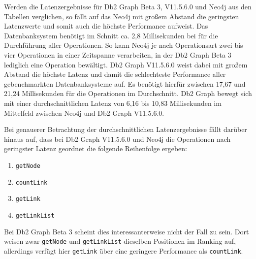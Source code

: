 \begin{table}[!h]
\centering
{}
\caption{Latenz Linkbench-10M-Const Neo4j}
\label{tab:latenz_10m_const:neo4j}
\end{table}

Werden die Latenzergebnisse für Db2 Graph Beta 3, V11.5.6.0 und Neo4j aus den Tabellen verglichen, so fällt auf das Neo4j mit großem Abstand die geringsten Latenzwerte und somit auch die höchste Performance aufweist. Das Datenbanksystem benötigt im Schnitt ca. 2,8 Millisekunden bei für die Durchführung aller Operationen. So kann Neo4j je nach Operationsart zwei bis vier Operationen in einer Zeitspanne verarbeiten, in der Db2 Graph Beta 3 lediglich eine Operation bewältigt. Db2 Graph V11.5.6.0 weist dabei mit großem Abstand die höchste Latenz und damit die schlechteste Performance aller gebenchmarkten Datenbanksysteme auf. Es benötigt hierfür zwischen 17,67 und 21,24 Millisekunden für die Operationen im Durchschnitt. Db2 Graph bewegt sich mit einer durchschnittlichen Latenz von 6,16 bis 10,83 Millisekunden im Mittelfeld zwischen Neo4j und Db2 Graph V11.5.6.0.

Bei genauerer Betrachtung der durchschnittlichen Latenzergebnisse fällt darüber hinaus auf, dass bei Db2 Graph V11.5.6.0 und Neo4j die Operationen nach geringster Latenz geordnet die folgende Reihenfolge ergeben:
\begin{enumerate}
    \item \texttt{getNode}
    \item \texttt{countLink}
    \item \texttt{getLink}
    \item \texttt{getLinkList}
\end{enumerate}
Bei Db2 Graph Beta 3 scheint dies interessanterweise nicht der Fall zu sein. Dort weisen zwar \texttt{getNode} und \texttt{getLinkList} dieselben Positionen im Ranking auf, allerdings verfügt hier \texttt{getLink} über eine geringere Performance als \texttt{countLink}.

